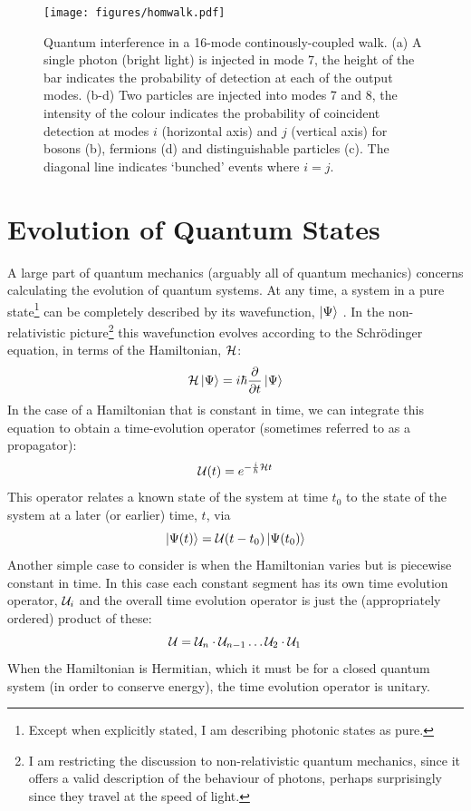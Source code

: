 \begin{figure}
  \centering
  \texttt{[image: figures/homwalk.pdf]}
  \caption[Quantum interference in a continuously-coupled walk]
  {Quantum interference in a 16-mode continously-coupled walk. (a) A single
  photon (bright light) is injected in mode 7, the height of the bar indicates
  the probability of detection at each of the output modes. (b-d) Two particles
  are injected into modes 7 and 8, the intensity of the colour indicates the
  probability of coincident detection at modes \(i\) (horizontal axis) and \(j\)
  (vertical axis) for bosons (b), fermions (d) and distinguishable particles
  (c). The diagonal line indicates `bunched' events where \(i=j\).}
  \label{fig:HoMWalk}
\end{figure}

\section{Evolution of Quantum States}
\label{sec:Evolution}
A large part of quantum mechanics (arguably all of quantum mechanics) concerns
calculating the evolution of quantum systems. At any time, a system in a pure
state\footnote{Except when explicitly stated, I am describing photonic states as
pure.} can be completely described by
its wavefunction, \(\left|\Psi\right\rangle\) \cite{pbr}. In the non-relativistic
picture\footnote{I am restricting the discussion to non-relativistic quantum
mechanics, since it offers a valid description of the behaviour of photons,
perhaps surprisingly since they travel at the speed of light.} this
wavefunction evolves according to the Schr\"odinger equation, in terms of the
Hamiltonian, \(\mathcal{H}\):
\begin{equation}
  \mathcal{H} \left|\Psi\right\rangle = i \hbar \frac{\partial}{\partial t} \left|\Psi\right\rangle
\end{equation}
In the case of a Hamiltonian that is constant in time, we can integrate this
equation to obtain a time-evolution operator (sometimes referred to as a
propagator):
\begin{equation}
  \label{eq:expiht}
  \mathcal{U} \!\left(t\right) = e^{-\frac{i}{\hbar} \mathcal{H} t}
\end{equation}
This operator relates a known state of the system at time \(t_{0}\) to the state
of the system at a later (or earlier) time, \(t\), via
\begin{equation}
  \left| \Psi \!\left(t\right) \right\rangle = \mathcal{U} \!\left(t-t_{0}\right) \left| \Psi \!\left(t_{0}\right) \right\rangle
\end{equation}
Another simple case to consider is when the Hamiltonian varies but is piecewise
constant in time. In this case each constant segment has its own time evolution
operator, \(\mathcal{U}_{i}\) and  the overall time evolution operator is just the
(appropriately ordered) product of these:
\begin{equation}
  \mathcal{U} = \mathcal{U}_{n} \cdot \mathcal{U}_{n-1} \dots \mathcal{U}_{2} \cdot \mathcal{U}_{1}
\end{equation}
When the Hamiltonian is Hermitian, which it must be for a closed quantum system
(in order to conserve energy), the time evolution operator is unitary.

